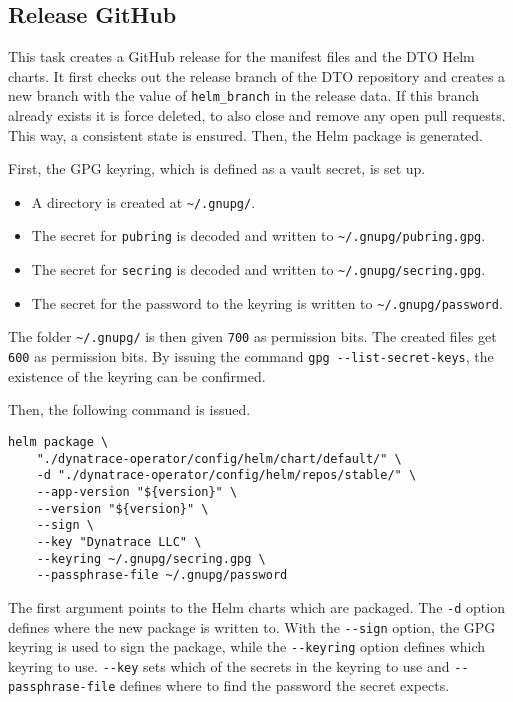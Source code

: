 \subsection{Release GitHub}\label{subsec:release-github}

This task creates a GitHub release for the manifest files and the DTO Helm charts.
It first checks out the release branch of the DTO repository and creates a new branch with the value of \verb|helm_branch| in the release data.
If this branch already exists it is force deleted, to also close and remove any open pull requests.
This way, a consistent state is ensured.
Then, the Helm package is generated.

First, the GPG keyring, which is defined as a vault secret, is set up.
\begin{itemize}
    \item A directory is created at \verb|~/.gnupg/|.
    \item The secret for \verb|pubring| is decoded and written to \verb|~/.gnupg/pubring.gpg|.
    \item The secret for \verb|secring| is decoded and written to \verb|~/.gnupg/secring.gpg|.
    \item The secret for the password to the keyring is written to \verb|~/.gnupg/password|.
\end{itemize}

The folder \verb|~/.gnupg/| is then given \verb|700| as permission bits.
The created files get \verb|600| as permission bits.
By issuing the command \verb|gpg --list-secret-keys|, the existence of the keyring can be confirmed.

Then, the following command is issued.

\begin{verbatim}
helm package \
    "./dynatrace-operator/config/helm/chart/default/" \
    -d "./dynatrace-operator/config/helm/repos/stable/" \
    --app-version "${version}" \
    --version "${version}" \
    --sign \
    --key "Dynatrace LLC" \
    --keyring ~/.gnupg/secring.gpg \
    --passphrase-file ~/.gnupg/password
\end{verbatim}

The first argument points to the Helm charts which are packaged.
The \verb|-d| option defines where the new package is written to.
With the \verb|--sign| option, the GPG keyring is used to sign the package, while the \verb|--keyring| option defines which keyring to use.
\verb|--key| sets which of the secrets in the keyring to use and \verb|--passphrase-file| defines where to find the password the secret expects.

